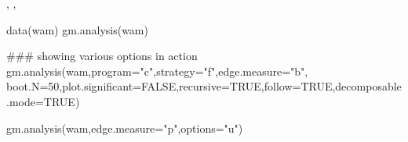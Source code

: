\begin{SeeAlso}\relax
{}, , 
\end{SeeAlso}
\begin{Examples}
\begin{ExampleCode}
  data(wam)
  gm.analysis(wam)
  
  ### showing various options in action
  gm.analysis(wam,program="c",strategy="f",edge.measure="b",
    boot.N=50,plot.significant=FALSE,recursive=TRUE,follow=TRUE,decomposable.mode=TRUE)
              
  gm.analysis(wam,edge.measure="p",options="u")
\end{ExampleCode}
\end{Examples}

